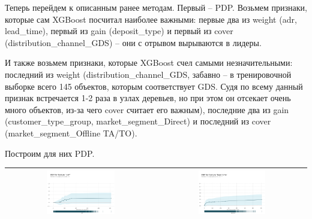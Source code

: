 Теперь перейдем к описанным ранее методам. Первый -- PDP. Возьмем признаки, которые сам XGBoost посчитал наиболее важными: первые два из weight (adr, lead\_time), первый из gain (deposit\_type) и первый из cover (distribution\_channel\_GDS) -- они с отрывом вырываются в лидеры.

И также возьмем признаки, которые XGBoost счел самыми незначительными: последний из weight (distribution\_channel\_GDS, забавно -- в тренировочной выборке всего 145 объектов, которым соответствует GDS. Судя по всему данный признак встречается 1-2 раза в узлах деревьев, но при этом он отсекает очень много объектов, из-за чего cover считает его важным), последние два из gain (customer\_type\_group, market\_segment\_Direct) и последний из cover (market\_segment\_Offline TA/TO).

Построим для них PDP. %

\begin{tabular}{c|c}
	\arrayrulecolor[rgb]{0.8,0.85,1}
	\includegraphics*[width = 0.47\textwidth]{pics/mypdp1.png} & \includegraphics*[width = 0.47\textwidth]{pics/mypdp2.png}\\
	\hline
\end{tabular}\\[2mm]